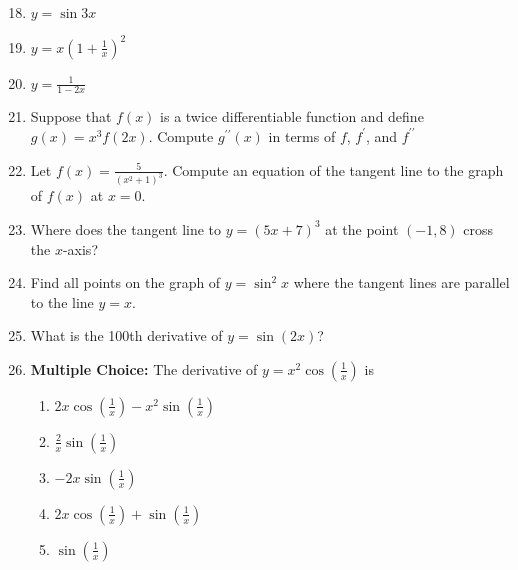 \documentclass[12pt]{article}
\newif\ifans
\begin{document}

\begin{enumerate}
\setcounter{enumi}{17}

\item $y = \sin{3x}$ 

\ifans{\fbox{$-9\sin{3x}$}} \fi

\item $y = x\left(1+\frac{1}{x}\right)^2$ 

\ifans{\fbox{$2x^{-3}$}} \fi

\item $y = \frac{1}{1-2x}$ 

\ifans{\fbox{$\frac{8}{(1-2x)^3}$}} \fi

\item  Suppose that $f(x)$ is a twice differentiable function and define $g(x)=x^3f(2x)$.  Compute $g^{\prime \prime}(x)$ in terms of $f$, $f^{\prime}$, and $f^{\prime \prime}$

\ifans{\fbox{$g^{\prime \prime}(x)=4x^3f^{\prime \prime}(2x)+12x^2f^{\prime}(2x)+6xf(2x)$}} \fi

\item Let $f(x)=\frac{5}{(x^2+1)^3}$.  Compute an equation of the tangent line to the graph of $f(x)$ at $x=0$.

\ifans{\fbox{$y=5$}} \fi

\item Where does the tangent line to $y=(5x+7)^3$ at the point $(-1,8)$ cross the $x$-axis?

\ifans{\fbox{$x=-\frac{17}{15}$}} \fi

\item Find all points on the graph of $y=\sin^2{x}$ where the tangent lines are parallel to the line $y=x$.

\ifans{\fbox{$\frac{\pi}{4}+\pi k$ where $k$ is any integer}} \fi

\item What is the 100th derivative of $y=\sin{(2x)}$?

\ifans{\fbox{$2^{100}\sin{2x}$}} \fi

\newpage

\item {\bf Multiple Choice:} The derivative of $y=x^2\cos{\left(\frac{1}{x}\right)}$ is

\begin{enumerate}

\item $2x\cos{\left(\frac{1}{x}\right)}-x^2\sin{\left(\frac{1}{x}\right)}$

\item $\frac{2}{x}\sin{\left(\frac{1}{x}\right)}$

\item $-2x\sin{\left(\frac{1}{x}\right)}$

\item $2x\cos{\left(\frac{1}{x}\right)}+\sin{\left(\frac{1}{x}\right)}$

\item $\sin{\left(\frac{1}{x}\right)}$

\end{enumerate}

\ifans{\fbox{D}} \fi

\end{enumerate}
\end{document}
